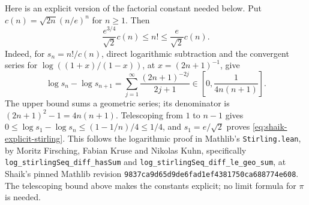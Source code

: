 \documentclass[11pt]{article}
\theoremstyle{remark}\newtheorem{remark}[proposition]{Remark}
\begin{document}
Here is an explicit version of the factorial constant needed below.
Put \(c(n)=\sqrt{2n}(n/e)^n\) for \(n\ge1\). Then
\begin{equation}\label{eq:shaik-explicit-stirling}
 \frac{e^{3/4}}{\sqrt2}c(n)\le n!\le\frac e{\sqrt2}c(n).
\end{equation}
Indeed, for \(s_n=n!/c(n)\), direct logarithmic subtraction and
the convergent series for \(\log((1+x)/(1-x))\), at \(x=(2n+1)^{-1}\),
give
\[
 \log s_n-\log s_{n+1}
 =\sum_{j=1}^{\infty}\frac{(2n+1)^{-2j}}{2j+1}
 \in\left[0,\frac1{4n(n+1)}\right].
\]
The upper bound sums a geometric series; its denominator is
\((2n+1)^2-1=4n(n+1)\).
Telescoping from \(1\) to \(n-1\) gives
\(0\le\log s_1-\log s_n\le(1-1/n)/4\le1/4\),
and \(s_1=e/\sqrt2\) proves \eqref{eq:shaik-explicit-stirling}.
This follows the logarithmic proof in Mathlib's
\texttt{Stirling.lean}, by Moritz Firsching, Fabian Kruse and
Nikolas Kuhn, specifically
\texttt{log\_stirlingSeq\_diff\_hasSum} and
\texttt{log\_stirlingSeq\_diff\_le\_geo\_sum},
at Shaik's pinned Mathlib revision
\texttt{9837ca9d65d9de6fad1ef4381750ca688774e608}.
The telescoping bound above makes the constants explicit;
no limit formula for \(\pi\) is needed.
\end{document}
